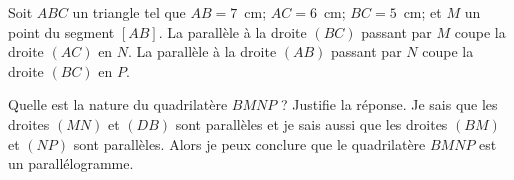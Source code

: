 Soit $ABC$ un triangle tel que $AB=7$~cm; $AC=6$~cm; $BC=5$~cm; et $M$
 un point du segment $[AB]$. La parallèle à la droite $(BC)$ passant
 par $M$ coupe la droite $(AC)$ en $N$.  La parallèle à la droite
 $(AB)$ passant par $N$ coupe la droite $(BC)$ en $P$.
\par Quelle est la nature du quadrilatère $BMNP$ ? Justifie la
réponse.
Je sais que les droites $(MN)$ et $(DB)$ sont parallèles et je sais
aussi que les droites $(BM)$ et $(NP)$ sont parallèles. Alors je peux
conclure que le quadrilatère $BMNP$ est un parallélogramme.